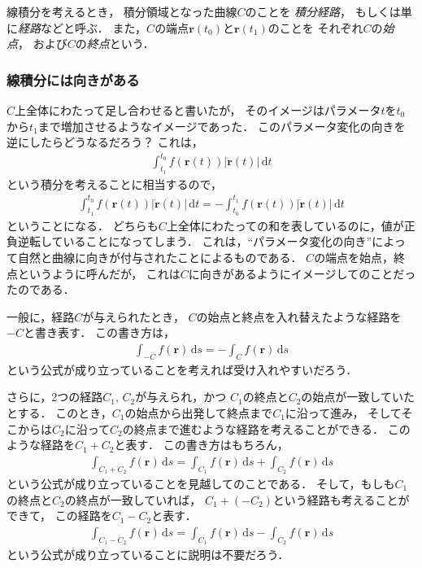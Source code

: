 線積分を考えるとき，
積分領域となった曲線$C$のことを
\emph{積分経路}，
もしくは単に\emph{経路}などと呼ぶ．
また，$C$の端点$\bm{r}(t_0)$と$\bm{r}(t_1)$のことを
それぞれ$C$の\emph{始点}，
および$C$の\emph{終点}という．

\subsubsection{線積分には向きがある}
$C$上全体にわたって足し合わせると書いたが，
そのイメージはパラメータ$t$を$t_0$から$t_1$まで増加させるようなイメージであった．
このパラメータ変化の向きを逆にしたらどうなるだろう？ これは，
\begin{align*}
\int_{t_1}^{t_0} f(\bm{r}(t)) \lvert \dot { \bm{r} } (t)  \rvert \, \mathrm{d} t
\end{align*}
という積分を考えることに相当するので，
\begin{align*}
\int_{t_1}^{t_0} f(\bm{r}(t)) \lvert \dot { \bm{r} } (t)  \rvert \, \mathrm{d} t
= - \int_{t_0}^{t_1} f(\bm{r}(t)) \lvert \dot { \bm{r} } (t)  \rvert \, \mathrm{d} t
\end{align*}
ということになる．
どちらも$C$上全体にわたっての和を表しているのに，値が正負逆転していることになってしまう．
これは，``パラメータ変化の向き''によって自然と曲線に向きが付与されたことによるものである．
$C$の端点を始点，終点というように呼んだが，
これは$C$に向きがあるようにイメージしてのことだったのである．

一般に，経路$C$が与えられたとき，
$C$の始点と終点を入れ替えたような経路を$-C$と書き表す．
この書き方は，
\begin{align}
\int_{-C} f( \bm{r} ) \, \mathrm{d} s = - \int_C f( \bm{r} ) \, \mathrm{d}s 
\label{eq:keirogyaku}
\end{align}
という公式が成り立っていることを考えれば受け入れやすいだろう．

さらに，2つの経路$C_1, \, C_2$が与えられ，かつ
$C_1$の終点と$C_2$の始点が一致していたとする．
このとき，$C_1$の始点から出発して終点まで$C_1$に沿って進み，
そしてそこからは$C_2$に沿って$C_2$の終点まで進むような経路を考えることができる．
このような経路を$C_1+C_2$と表す．
この書き方はもちろん，
\begin{align}
\int_{C_1+C_2} f(\bm{r} ) \, \mathrm{d}s = 
\int_{C_1} f(\bm{r}) \, \mathrm{d} s + 
\int_{C_2} f(\bm{r}) \, \mathrm{d} s
\label{eq:keirowa}
\end{align}
という公式が成り立っていることを見越してのことである．
そして，もしも$C_1$の終点と$C_2$の終点が一致していれば，
$C_1+ (-C_2)$という経路も考えることができて，
この経路を$C_1-C_2$と表す．
\begin{align}
\int_{C_1-C_2} f ( \bm{r} ) \, \mathrm{d} s
= \int_{C_1} f(\bm{r}) \, \mathrm{d} s -
\int_{C_2} f(\bm{r}) \, \mathrm{d} s 
\label{eq:keirosa}
\end{align}
という公式が成り立っていることに説明は不要だろう．

